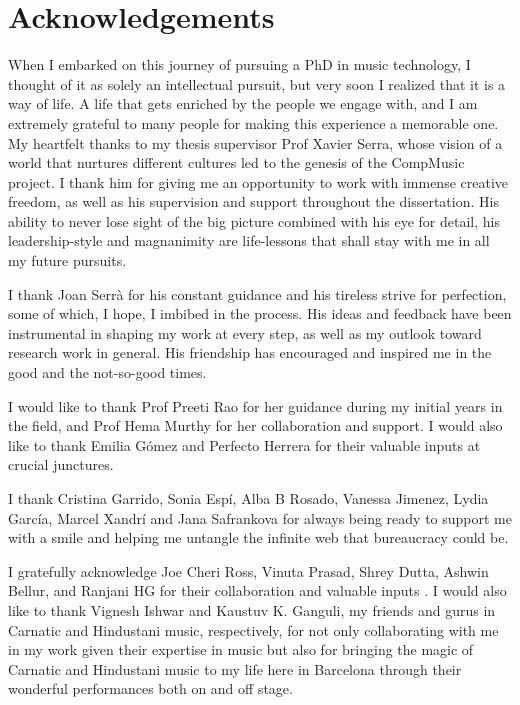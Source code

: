 \chapter*{Acknowledgements}

When I embarked on this journey of pursuing a PhD in music technology, I thought of it as solely an intellectual pursuit, but very soon I realized that it is a way of life. A life that gets enriched by the people we engage with, and I am extremely grateful to many people for making this experience a memorable one. My heartfelt thanks to my thesis supervisor Prof Xavier Serra, whose vision of a world that nurtures different cultures led to the genesis of the CompMusic project. I thank him for giving me an opportunity to work with immense creative freedom, as well as his supervision and support throughout the dissertation. His ability to never lose sight of the big picture combined with his eye for detail, his leadership-style and magnanimity are life-lessons that shall stay with me in all my future pursuits.

I thank Joan Serrà for his constant guidance and his tireless strive for perfection, some of which, I hope, I imbibed in the process. His ideas and feedback have been instrumental in shaping my work at every step, as well as my outlook toward research work in general. His friendship has encouraged and inspired me in the good and the not-so-good times. 

I would like to thank Prof Preeti Rao for her guidance during my initial years in the field, and Prof Hema Murthy for her collaboration and support. I would also like to thank Emilia Gómez and Perfecto Herrera for their valuable inputs at crucial junctures.  

I thank Cristina Garrido, Sonia Espí, Alba B Rosado, Vanessa Jimenez, Lydia García, Marcel Xandrí and Jana Safrankova for always being ready to support me with a smile and helping me untangle the infinite web that bureaucracy could be. 

I gratefully acknowledge Joe Cheri Ross, Vinuta Prasad, Shrey Dutta, Ashwin Bellur, and Ranjani HG for their collaboration and valuable inputs . I would also like to thank Vignesh Ishwar and Kaustuv K. Ganguli, my friends and gurus in Carnatic and Hindustani music, respectively, for not only collaborating with me in my work given their expertise in music but also for bringing the magic of Carnatic and Hindustani music to my life here in Barcelona through their wonderful performances both on and off stage.

